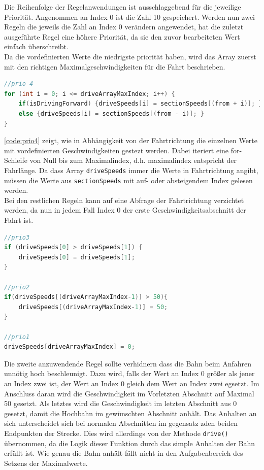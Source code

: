 Die Reihenfolge der Regelanwendungen ist ausschlaggebend für die jeweilige Priorität. Angenommen an Index 0 ist die Zahl 10 gespeichert. Werden nun zwei Regeln die jeweils die Zahl an Index 0 verändern angewendet, hat die zuletzt ausgeführte Regel eine höhere Priorität, da sie den zuvor bearbeiteten Wert einfach überschreibt. \\
Da die vordefinierten Werte die niedrigste priorität haben, wird das Array zuerst mit den richtigen Maximalgeschwindigkeiten für die Fahrt beschrieben. 
\vspace{0.5cm}
\begin{lstlisting}[language=c, style=dhpaperdefault]
//prio 4
for (int i = 0; i <= driveArrayMaxIndex; i++) {
	if(isDrivingForward) {driveSpeeds[i] = sectionSpeeds[(from + i)]; }
	else {driveSpeeds[i] = sectionSpeeds[(from - i)]; }
}

\end{lstlisting}
\vspace{0.5cm}
\autoref{code:prio4} zeigt, wie in Abhängigkeit von der Fahrtrichtung die einzelnen Werte mit vordefinierten Geschwindigkeiten gestezt werden. Dabei iteriert eine for-Schleife von Null bis zum Maximalindex, d.h. maximalindex entspricht der Fahrlänge. Da dass Array \texttt{driveSpeeds} immer die Werte in Fahrtrichtung angibt, müssen die Werte aus \texttt{sectionSpeeds} mit auf- oder absteigendem Index gelesen werden. \\
Bei den restlichen Regeln kann auf eine Abfrage der Fahrtrichtung verzichtet werden, da nun in jedem Fall Index 0 der erste Geschwindigkeitsabschnitt der Fahrt ist.
\vspace{0.5cm}
\begin{lstlisting}[language=c, style=dhpaperdefault]
//prio3
if (driveSpeeds[0] > driveSpeeds[1]) {
	driveSpeeds[0] = driveSpeeds[1];
}

//prio2
if(driveSpeeds[(driveArrayMaxIndex-1)] > 50){
	driveSpeeds[(driveArrayMaxIndex-1)] = 50;
}

//prio1
driveSpeeds[driveArrayMaxIndex] = 0; 
\end{lstlisting}
\vspace{0.5cm}
Die zweite anzuwendende Regel sollte verhidnern dass die Bahn beim Anfahren unnötig hoch beschleunigt. Dazu wird, falls der Wert an Index 0 größer als jener an Index zwei ist, der Wert an Index 0 gleich dem Wert an Index zwei egsetzt. Im Anschluss daran wird die Geschwindigkeit im Vorletzten Abschnitt auf Maximal 50 gesetzt. Als letztes wird die Geschwindigkeit im letzten Abschnitt aus 0 gesetzt, damit die Hochbahn im gewünschten Abschnitt anhält. Das Anhalten an sich unterscheidet sich bei normalen Abschnitten im gegensatz zden beiden Endpunkten der Strecke. Dies wird allerdings von der Methode \texttt{drive()} übernommen, da die Logik dieser Funktion durch das simple Anhalten der Bahn erfüllt ist. Wie genau die Bahn anhält fällt nicht in den Aufgabenbereich des Setzens der Maximalwerte.

